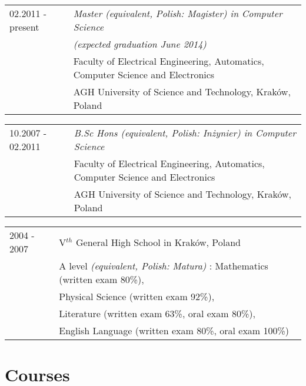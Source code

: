 \documentclass[a4paper,pdftex]{article}
\renewenvironment{itemize}{
  \begin{list}{}{
    \setlength{\leftmargin}{1.5em}
  }
}{
  \end{list}
}
\begin{document}
\begin{itemize}
 \item
  \begin{tabular}{p{}p{}}
   02.2011 - present & \itshape Master (equivalent, Polish: Magister) in Computer Science \\
                     & \itshape (expected graduation June 2014) \\
                     & Faculty of Electrical Engineering, Automatics, Computer Science and Electronics \\
                     & AGH University of Science and Technology, Kraków, Poland
  \end{tabular}
 \item
  \begin{tabular}{p{}p{}}
   10.2007 - 02.2011 & \itshape B.Sc Hons (equivalent, Polish: Inżynier) in Computer Science \\
                     & Faculty of Electrical Engineering, Automatics, Computer Science and Electronics \\
                     & AGH University of Science and Technology, Kraków, Poland
  \end{tabular}
 \item
  \begin{tabular}{p{}p{}}
   2004 - 2007       & V$^{th}$ General High School in Kraków, Poland \\
                     & A level {\itshape (equivalent, Polish: Matura)} : Mathematics (written exam 80\%), \\
                     & Physical Science (written exam 92\%), \\
                     & Literature (written exam 63\%, oral exam 80\%), \\
                     & English Language (written exam 80\%, oral exam 100\%)
  \end{tabular}
\end{itemize}

\section*{Courses}
\end{document}
